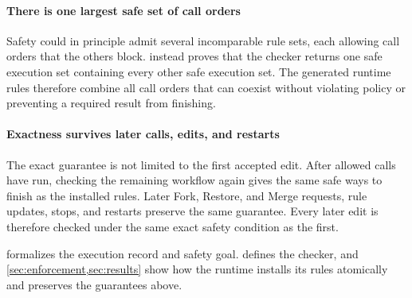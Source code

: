 \paragraph{There is one largest safe set of call orders}
Safety could in principle admit several incomparable rule sets, each allowing call orders that the others block.
 instead proves that the checker returns one safe execution set containing every other safe execution set.
The generated runtime rules therefore combine all call orders that can coexist without violating policy or preventing a required result from finishing.

\paragraph{Exactness survives later calls, edits, and restarts}
The exact guarantee is not limited to the first accepted edit.
After allowed calls have run, checking the remaining workflow again gives the same safe ways to finish as the installed rules.
Later Fork, Restore, and Merge requests, rule updates, stops, and restarts preserve the same guarantee.
Every later edit is therefore checked under the same exact safety condition as the first.

 formalizes the execution record and safety goal.
 defines the checker, and \cref{sec:enforcement,sec:results} show how the runtime installs its rules atomically and preserves the guarantees above.
